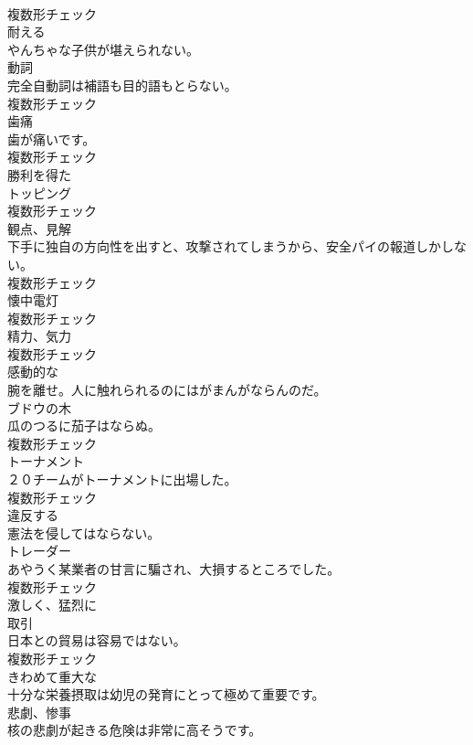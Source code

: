 \documentclass[8pt]{extreport}
\begin{document}
\begin{CJK}{UTF8}{min}
\\	複数形チェック
\\	[動詞]	耐える	
\\	やんちゃな子供が堪えられない。	
\\	[名詞]	動詞	
\\	完全自動詞は補語も目的語もとらない。	
\\	複数形チェック
\\	[名詞]	⻭痛	
\\	歯が痛いです。	
\\	複数形チェック
\\	[形容詞]	勝利を得た	
\\	[名詞]	トッピング	
\\	複数形チェック
\\	[名詞]	観点、見解	
\\	下手に独自の方向性を出すと、攻撃されてしまうから、安全パイの報道しかしない。	
\\	複数形チェック
\\	[名詞]	懐中電灯	
\\	複数形チェック
\\	[名詞]	精力、気力	
\\	複数形チェック
\\	[形容詞]	感動的な	
\\	腕を離せ。人に触れられるのにはがまんがならんのだ。	
\\	[名詞]	ブドウの木	
\\	瓜のつるに茄子はならぬ。	
\\	複数形チェック
\\	[名詞]	トーナメント	
\\	２０チームがトーナメントに出場した。	
\\	複数形チェック
\\	[動詞]	違反する	
\\	憲法を侵してはならない。	
\\	[名詞]	トレーダー	
\\	あやうく某業者の甘言に騙され、大損するところでした。	
\\	複数形チェック
\\	[副詞]	激しく、猛烈に	
\\	[名詞]	取引	
\\	日本との貿易は容易ではない。	
\\	複数形チェック
\\	[形容詞]	きわめて重大な	
\\	十分な栄養摂取は幼児の発育にとって極めて重要です。	
\\	[名詞]	悲劇、惨事	
\\	核の悲劇が起きる危険は非常に高そうです。	

\end{CJK}
\end{document}
